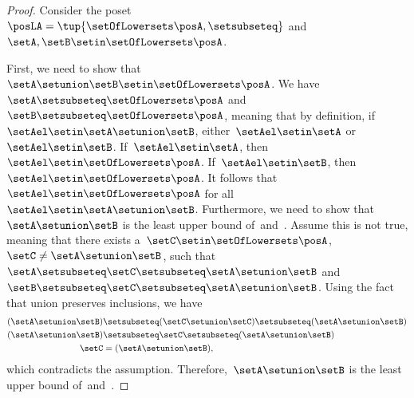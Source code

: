\begin{proof}
    Consider the poset~$\posLA=\tup{\setOfLowersets \posA, \setsubseteq}$ and~$\setA,\setB\setin \setOfLowersets \posA$.

    First, we need to show that~$\setA\setunion \setB\setin \setOfLowersets \posA$.
    We have~$\setA \setsubseteq \setOfLowersets \posA$ and~$\setB\setsubseteq \setOfLowersets \posA$, meaning that by definition, if~$\setAel\setin \setA\setunion \setB$, either~$\setAel\setin \setA$ or~$\setAel\setin \setB$.
    If~$\setAel\setin \setA$, then~$\setAel\setin \setOfLowersets \posA$.
    If~$\setAel\setin \setB$, then~$\setAel\setin \setOfLowersets \posA$.
    It follows that~$\setAel\setin \setOfLowersets \posA$ for all~$\setAel\setin \setA\setunion \setB$.
    Furthermore, we need to show that~$\setA\setunion \setB$ is the least upper bound of~\setA and~\setB.
    Assume this is not true, meaning that there exists a~$\setC\setin \setOfLowersets \posA$,~$\setC\neq \setA\setunion \setB$, such that~$\setA\setsubseteq \setC\setsubseteq \setA\setunion \setB$ and~$\setB\setsubseteq \setC\setsubseteq \setA\setunion \setB$.
    Using the fact that union preserves inclusions, we have
    \begin{equation}
        \begin{aligned}
            (\setA\setunion \setB)
                                   & \setsubseteq (\setC \setunion \setC) \setsubseteq (\setA \setunion \setB) \\
            (\setA\setunion \setB) & \setsubseteq \setC \setsubseteq (\setA\setunion \setB) \\
            \setC                  & = (\setA\setunion \setB),
        \end{aligned}
    \end{equation}
    which contradicts the assumption.
    Therefore,~$\setA\setunion \setB$ is the least upper bound of~\setA and~\setB.


\end{proof}
